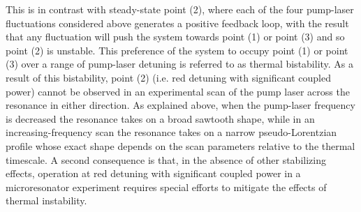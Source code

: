 This is in contrast with steady-state point (2), where each of the four pump-laser fluctuations considered above generates a positive feedback loop, with the result that any fluctuation will push the system towards point (1) or point (3) and so point (2) is unstable. This preference of the system to occupy point (1) or point (3) over a range of pump-laser detuning is referred to as thermal bistability. As a result of this bistability, point (2) (i.e. red detuning with significant coupled power) cannot be observed in an experimental scan of the pump laser across the resonance in either direction. As explained above, when the pump-laser frequency is decreased the resonance takes on a broad sawtooth shape, while in an increasing-frequency scan the resonance takes on a narrow pseudo-Lorentzian profile whose exact shape depends on the scan parameters relative to the thermal timescale. A second consequence is that, in the absence of other stabilizing effects, operation at red detuning with significant coupled power in a microresonator experiment requires special efforts to mitigate the effects of thermal instability.


%	

